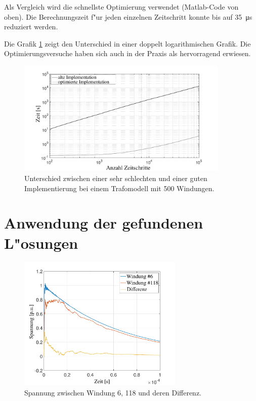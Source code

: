 \begin{refsection}
Als Vergleich wird die schnellste Optimierung verwendet (Matlab-Code von oben). Die Berechnungszeit f"ur jeden einzelnen Zeitschritt konnte bis auf \SI{35}{\micro \second} reduziert werden. 

Die Grafik \ref{trafo:Optimierung} zeigt den Unterschied in einer doppelt logarithmischen Grafik. Die Optimierungsversuche haben sich auch in der Praxis als hervorragend erwiesen.

\begin{figure}
	\centering
	\includegraphics[width=0.9\textwidth]{./trafo/images/differenceOptimization.pdf}
	\caption{Unterschied zwischen einer sehr schlechten und einer guten Implementierung bei einem Trafomodell mit 500 Windungen.}
	\label{trafo:Optimierung}
\end{figure}

\section{Anwendung der gefundenen L"osungen}

\begin{figure}
	\centering
	\includegraphics[width=0.7\textwidth]{./Trafo/images/solution.pdf}
	\caption{Spannung zwischen Windung 6, 118 und deren Differenz.}
	\label{fig:solution}
\end{figure}


\end{refsection}
